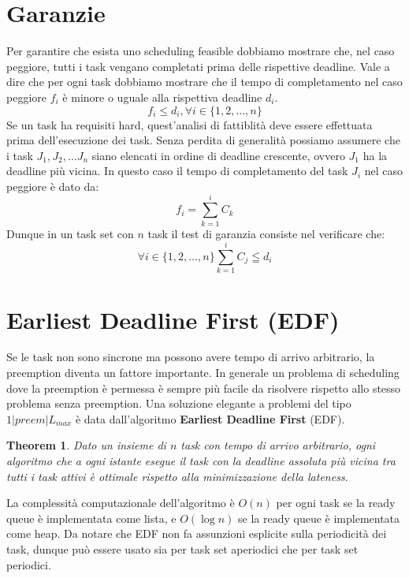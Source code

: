 \documentclass[12pt,openany,onesided]{book}
\newtheorem{theorem}{Theorem}
\begin{document}
\section{Garanzie}
Per garantire che esista uno scheduling feasible dobbiamo mostrare che, nel caso peggiore, tutti i task vengano completati prima delle rispettive deadline.
Vale a dire che per ogni task dobbiamo mostrare che il tempo di completamento nel caso peggiore $f_i$ è minore o uguale alla rispettiva deadline $d_i$.
\begin{equation}
    f_i \leq d_i , \forall i \in \{1,2,\ldots,n\}
\end{equation}
Se un task ha requisiti hard, quest'analisi di fattiblità deve essere effettuata prima dell'esecuzione dei task.
Senza perdita di generalità possiamo assumere che i task $J_1,J_2,\dots J_n$ siano elencati in ordine di deadline crescente, ovvero $J_1$ ha la deadline più vicina.
In questo caso il tempo di completamento del task $J_i$ nel caso peggiore è dato da:
\begin{equation}
    f_i=\sum_{k=1}^{i} C_k
\end{equation}
Dunque in un task set con $n$ task il test di garanzia consiste nel verificare che:
\begin{equation}
    \forall i \in \{1,2,\dots ,n\} \sum_{k=1}^i C_j \leqq d_i
\end{equation}
\section{Earliest Deadline First (EDF)}
Se le task non sono sincrone ma possono avere tempo di arrivo arbitrario, la preemption diventa un fattore importante.
In generale un problema di scheduling dove la preemption è permessa è sempre più facile da risolvere rispetto allo stesso problema senza preemption.
Una soluzione elegante a problemi del tipo $1|preem|L_{max}$ è data dall'algoritmo \textbf{Earliest Deadline First} (EDF).
\begin{theorem}
    Dato un insieme di $n$ task con tempo di arrivo arbitrario, ogni algoritmo che a ogni istante esegue il task con la deadline assoluta più vicina tra tutti i task attivi è ottimale rispetto alla minimizzazione della lateness.
\end{theorem}
La complessità computazionale dell'algoritmo è $O(n)$ per ogni task se la ready queue è implementata come lista, e $O(\log n)$ se la ready queue è implementata come heap.
Da notare che EDF non fa assunzioni esplicite sulla periodicità dei task, dunque può essere usato sia per task set aperiodici che per task set periodici.
\end{document}
